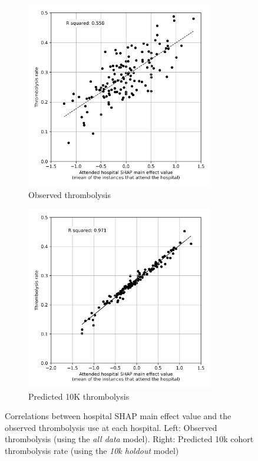 \begin{figure}[!h]
\centering
\begin{subfigure}{.49\textwidth}
  \centering
    \caption*{\footnotesize{\textsf{Observed thrombolysis}}}
    \includegraphics[width=0.9\textwidth]{./images/03c_xgb_10_features_attended_hosp_shap_maineffect_vs_ivt_rate}
\end{subfigure}
\begin{subfigure}{.49\textwidth}
  \centering
    \caption*{\footnotesize{\textsf{Predicted 10K thrombolysis}}}
    \includegraphics[width=0.9\textwidth]{./images/04a_xgb_10_features_10k_cohort_attended_hosp_shap_maineffect_vs_ivt_rate}
\end{subfigure}

\caption{Correlations between hospital SHAP main effect value and the observed thrombolysis use at each hospital. Left: Observed thrombolysis (using the \emph{all data} model). Right: Predicted 10k cohort thrombolysis rate (using the \emph{10k holdout} model)}
\label{fig:shap_correlation}
\end{figure}


